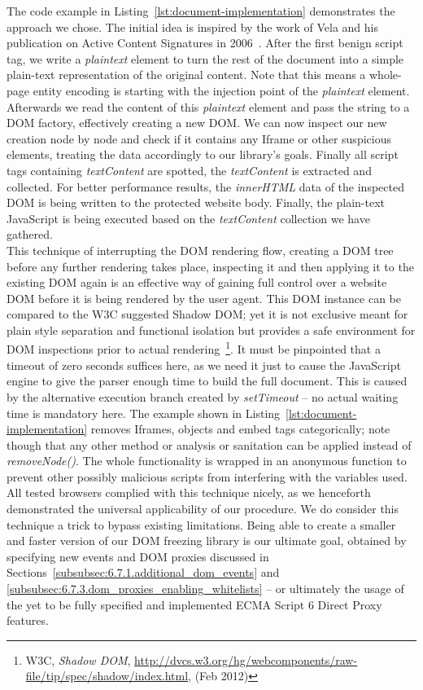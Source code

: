     The code example in Listing~\ref{lst:document-implementation} demonstrates the approach we chose. The initial idea is inspired by the work of Vela and his publication on Active Content Signatures in 2006~\cite{vela_nava_acs_2006}. After the first benign script tag, we write a \textit{plaintext} element to turn the rest of the document into a simple plain-text representation of the original content. Note that this means a whole-page entity encoding is starting with the injection point of the \textit{plaintext} element. Afterwards we read the content of this \textit{plaintext} element and pass the string to a DOM factory, effectively creating a new DOM. We can now inspect our new creation node by node and check if it contains any Iframe or other suspicious elements, treating the data accordingly to our library's goals. Finally all script tags containing \textit{textContent} are spotted, the \textit{textContent} is extracted and collected. For better performance results, the \textit{innerHTML} data of the inspected DOM is being written to the protected website body. Finally, the plain-text JavaScript is being executed based on the \textit{textContent} collection we have gathered. \\

    This technique of interrupting the DOM rendering flow, creating a DOM tree before any further rendering takes place, inspecting it and then applying it to the existing DOM again is an effective way of gaining full control over a website DOM before it is being rendered by the user agent. This DOM instance can be compared to the W3C suggested Shadow DOM; yet it is not exclusive meant for plain style separation and functional isolation but provides a safe environment for DOM inspections prior to actual rendering~\footnote{W3C, \textit{Shadow DOM}, \url{http://dvcs.w3.org/hg/webcomponents/raw-file/tip/spec/shadow/index.html}, (Feb 2012)}. It must be pinpointed that a timeout of zero seconds suffices here, as we need it just to cause the JavaScript engine to give the parser enough time to build the full document. This is caused by the alternative execution branch created by \textit{setTimeout} -- no actual waiting time is mandatory here. The example shown in Listing~\ref{lst:document-implementation} removes Iframes, objects and embed tags categorically; note though that any other method or analysis or sanitation can be applied instead of \textit{removeNode()}. The whole functionality is wrapped in an anonymous function to prevent other possibly malicious scripts from interfering with the variables used. All tested browsers complied with this technique nicely, as we henceforth demonstrated the universal applicability of our procedure. We do consider this technique a trick to bypass existing limitations. Being able to create a smaller and faster version of our DOM freezing library is our ultimate goal, obtained by specifying new events and DOM proxies discussed in Sections~\ref{subsubsec:6.7.1.additional_dom_events} and \ref{subsubsec:6.7.3.dom_proxies_enabling_whitelists} -- or ultimately the usage of the yet to be fully specified and implemented ECMA Script 6 Direct Proxy features.

